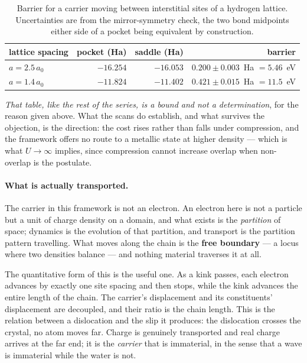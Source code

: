 \documentclass[11pt]{article}
\begin{document}
\begin{table}[h]\centering
\small
\begin{tabular}{@{}lrrr@{}}
\toprule
lattice spacing & pocket (Ha) & saddle (Ha) & barrier\\
\midrule
$a=2.5\,a_0$ & $-16.254$ & $-16.053$ & $0.200\pm0.003$~Ha $=5.46$~eV\\
$a=1.4\,a_0$ & $-11.824$ & $-11.402$ & $0.421\pm0.015$~Ha $=11.5$~eV\\
\bottomrule
\end{tabular}
\caption{Barrier for a carrier moving between interstitial sites of a hydrogen lattice. Uncertainties
are from the mirror-symmetry check, the two bond midpoints either side of a pocket being equivalent
by construction.}
\label{tab:barrier}
\end{table}
\noindent \emph{That table, like the rest of the series, is a bound and not a determination}, for the
reason given above. What the scans do establish, and what survives the objection, is the direction:
the cost rises rather than falls under compression, and the framework offers no route to a metallic
state at higher density --- which is what $U\to\infty$ implies, since compression cannot increase
overlap when non-overlap is the postulate.


\paragraph{What is actually transported.} The carrier in this framework is not an electron. An
electron here is not a particle but a unit of charge density on a domain, and what exists is the
\emph{partition} of space; dynamics is the evolution of that partition, and transport is the
partition pattern travelling. What moves along the chain is the \textbf{free boundary} --- a locus
where two densities balance --- and nothing material traverses it at all.

The quantitative form of this is the useful one. As a kink passes, each electron advances by exactly
one site spacing and then stops, while the kink advances the entire length of the chain. The
carrier's displacement and its constituents' displacement are decoupled, and their ratio is the
chain length. This is the relation between a dislocation and the slip it produces: the dislocation
crosses the crystal, no atom moves far. Charge is genuinely transported and real charge arrives at
the far end; it is the \emph{carrier} that is immaterial, in the sense that a wave is immaterial
while the water is not.
\end{document}
